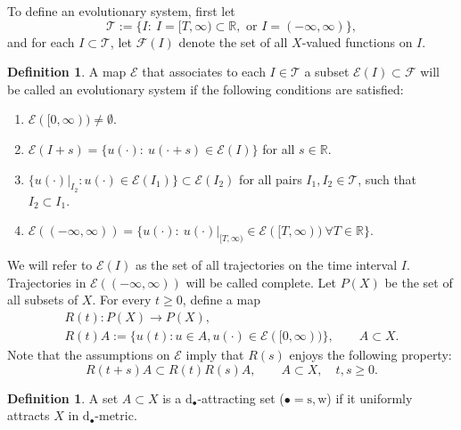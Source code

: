 \documentclass{amsart}
\newcommand{\Ec}{\mathcal{E}}
\numberwithin{Theorem}{section}
\theoremstyle{definition}
\newtheorem{Definition}[Theorem]{Definition}
\theoremstyle{remark}
\begin{document}
To define an evolutionary system, first let
\[
\mathcal{T} := \{ I: \ I=[T,\infty) \subset \mathbb{R}, \mbox{ or } 
I=(-\infty, \infty) \},
\]
and for each $I \subset \mathcal{T}$, let $\mathcal{F}(I)$ denote
the set of all $X$-valued functions on $I$.
\begin{Definition} \label{Dc}
A map $\Ec$ that associates to each $I\in \mathcal{T}$ a subset
$\Ec(I) \subset \mathcal{F}$ will be called an evolutionary system if
the following conditions are satisfied:
\begin{enumerate}
\item $\Ec([0,\infty)) \ne \emptyset$.
\item
$\Ec(I+s)=\{u(\cdot): \ u(\cdot +s) \in \Ec(I) \}$ for
all $s \in \mathbb{R}$.
\item $\{u(\cdot)|_{I_2} : u(\cdot) \in \Ec(I_1)\}
\subset \Ec(I_2)$ for all
pairs $I_1,I_2 \in \mathcal{T}$, such that $I_2 \subset I_1$.
\item
$\Ec((-\infty , \infty)) = \{u(\cdot) : \ u(\cdot)|_{[T,\infty)}
\in \Ec([T, \infty)) \ \forall T \in \mathbb{R} \}.$
\end{enumerate}
\end{Definition}
We will refer to $\Ec(I)$ as the set of all trajectories
on the time interval $I$. Trajectories in $\Ec((-\infty,\infty))$ will be called complete.
Let $P(X)$ be the set of all subsets of $X$.
For every $t \geq 0$, define a map
\begin{eqnarray*}
&R(t):P(X) \to P(X),&\\
&R(t)A := \{u(t): u\in A, u(\cdot) \in \Ec([0,\infty))\}, \qquad
A \subset X.&
\end{eqnarray*}
Note that the assumptions on $\Ec$ imply that $R(s)$ enjoys
the following property:
\begin{equation} \label{eq:propR(T)}
R(t+s)A \subset R(t)R(s)A, \qquad A \subset X,\quad t,s \geq 0.
\end{equation}

\begin{Definition}
A set $A \subset X$ is a $\mathrm{d}_{\bullet}$-attracting set
($\bullet = \mathrm{s,w}$) if it uniformly
attracts $X$ in $\mathrm{d}_{\bullet}$-metric.
\end{Definition}
\end{document}
